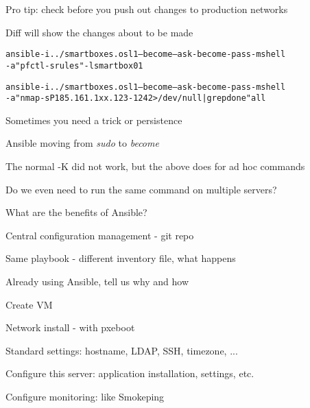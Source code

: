 \documentclass[18pt,landscape,a4paper,footrule]{foils}
\begin{document}
\begin{list2}
\item Pro tip: check before you push out changes to production networks \smiley
\item Diff will show the changes about to be made
\end{list2}


\begin{alltt}\footnotesize
ansible -i ../smartboxes.osl1 --become --ask-become-pass -m shell
-a "pfctl -s rules" -l smartbox01

ansible -i ../smartboxes.osl1 --become --ask-become-pass -m shell
-a "nmap -sP 185.161.1xx.123-124 2> /dev/null| grep done" all
\end{alltt}

\begin{list2}
\item Sometimes you need a trick or persistence
\item Ansible moving from \emph{sudo} to \emph{become}
\item The normal -K did not work, but the above does for ad hoc commands
\end{list2}




Do we even need to run the same command on multiple servers?

What are the benefits of Ansible?
\begin{list2}
\item Central configuration management - git repo
\item Same playbook - different inventory file, what happens
\item Already using Ansible, tell us why and how
\end{list2}


\begin{list2}
\item Create VM
\item Network install - with pxeboot
\item Standard settings: hostname, LDAP, SSH, timezone,  ...
\item Configure this server: application installation, settings, etc.
\item Configure monitoring: like Smokeping
\end{list2}
\end{document}
